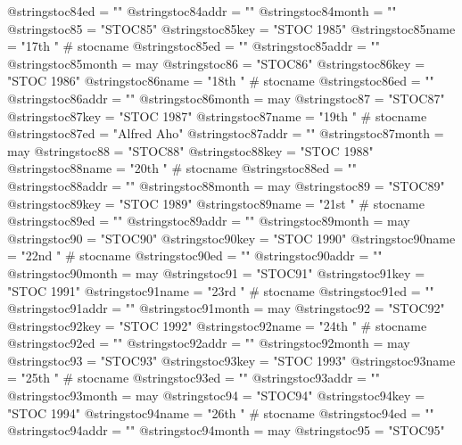 @string{stoc84ed =              ""}
@string{stoc84addr =            ""}
@string{stoc84month =           ""}
@string{stoc85 =                "STOC85"}
@string{stoc85key =             "STOC 1985"}
@string{stoc85name =            "17th " # stocname}
@string{stoc85ed =              ""}
@string{stoc85addr =            ""}
@string{stoc85month =           may}
@string{stoc86 =                "STOC86"}
@string{stoc86key =             "STOC 1986"}
@string{stoc86name =            "18th " # stocname}
@string{stoc86ed =              ""}
@string{stoc86addr =            ""}
@string{stoc86month =           may}
@string{stoc87 =                "STOC87"}
@string{stoc87key =             "STOC 1987"}
@string{stoc87name =            "19th " # stocname}
@string{stoc87ed =              "Alfred Aho"}
@string{stoc87addr =            ""}
@string{stoc87month =           may}
@string{stoc88 =                "STOC88"}
@string{stoc88key =             "STOC 1988"}
@string{stoc88name =            "20th " # stocname}
@string{stoc88ed =              ""}
@string{stoc88addr =            ""}
@string{stoc88month =           may}
@string{stoc89 =                "STOC89"}
@string{stoc89key =             "STOC 1989"}
@string{stoc89name =            "21st " # stocname}
@string{stoc89ed =              ""}
@string{stoc89addr =            ""}
@string{stoc89month =           may}
@string{stoc90 =                "STOC90"}
@string{stoc90key =             "STOC 1990"}
@string{stoc90name =            "22nd " # stocname}
@string{stoc90ed =              ""}
@string{stoc90addr =            ""}
@string{stoc90month =           may}
@string{stoc91 =                "STOC91"}
@string{stoc91key =             "STOC 1991"}
@string{stoc91name =            "23rd " # stocname}
@string{stoc91ed =              ""}
@string{stoc91addr =            ""}
@string{stoc91month =           may}
@string{stoc92 =                "STOC92"}
@string{stoc92key =             "STOC 1992"}
@string{stoc92name =            "24th " # stocname}
@string{stoc92ed =              ""}
@string{stoc92addr =            ""}
@string{stoc92month =           may}
@string{stoc93 =                "STOC93"}
@string{stoc93key =             "STOC 1993"}
@string{stoc93name =            "25th " # stocname}
@string{stoc93ed =              ""}
@string{stoc93addr =            ""}
@string{stoc93month =           may}
@string{stoc94 =                "STOC94"}
@string{stoc94key =             "STOC 1994"}
@string{stoc94name =            "26th " # stocname}
@string{stoc94ed =              ""}
@string{stoc94addr =            ""}
@string{stoc94month =           may}
@string{stoc95 =                "STOC95"}
